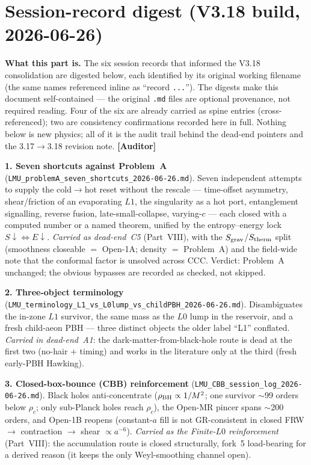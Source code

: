 \documentclass[11pt]{article}
\newcommand{\Auditor}{\textbf{\textcolor{teal!55!black}{[Auditor]}}}
\begin{document}
{}

\part{Session-record digest (V3.18 build, 2026-06-26)}
\noindent\textbf{What this part is.} The six session records that informed the V3.18 consolidation are digested below, each identified by its original working filename (the same names referenced inline as ``record \texttt{...}''). The digests make this document self-contained --- the original \texttt{.md} files are optional provenance, not required reading. Four of the six are already carried as spine entries (cross-referenced); two are consistency confirmations recorded here in full. Nothing below is new physics; all of it is the audit trail behind the dead-end pointers and the 3.17$\to$3.18 revision note. \Auditor

\smallskip\noindent\textbf{1. Seven shortcuts against Problem~A} (\texttt{LMU\_problemA\_seven\_shortcuts\_2026-06-26.md}). Seven independent attempts to supply the cold$\to$hot reset without the rescale --- time-offset asymmetry, shear/friction of an evaporating $L1$, the singularity as a hot port, entanglement signalling, reverse fusion, late-small-collapse, varying-$c$ --- each closed with a computed number or a named theorem, unified by the entropy--energy lock $S\!\downarrow\Leftrightarrow E\!\downarrow$. \emph{Carried as dead-end~C5} (Part~VIII), with the $S_{\rm grav}$/$S_{\rm therm}$ split (smoothness closeable $=$ Open-1A; density $=$ Problem~A) and the field-wide note that the conformal factor is unsolved across CCC. Verdict: Problem~A unchanged; the obvious bypasses are recorded as checked, not skipped.

\smallskip\noindent\textbf{2. Three-object terminology} (\texttt{LMU\_terminology\_L1\_vs\_L0lump\_vs\_childPBH\_2026-06-26.md}). Disambiguates the in-zone $L1$ survivor, the same mass as the $L0$ lump in the reservoir, and a fresh child-aeon PBH --- three distinct objects the older label ``L1'' conflated. \emph{Carried in dead-end~A1}: the dark-matter-from-black-hole route is dead at the first two (no-hair $+$ timing) and works in the literature only at the third (fresh early-PBH Hawking).

\smallskip\noindent\textbf{3. Closed-box-bounce (CBB) reinforcement} (\texttt{LMU\_CBB\_session\_log\_2026-06-26.md}). Black holes anti-concentrate ($\rho_{\rm BH}\propto1/M^2$; one survivor $\sim$99 orders below $\rho_c$; only sub-Planck holes reach $\rho_c$), the Open-MR pincer spans $\sim$200 orders, and Open-1B reopens (constant-$a$ fill is not GR-consistent in closed FRW $\to$ contraction $\to$ shear $\propto a^{-6}$). \emph{Carried as the Finite-$L0$ reinforcement} (Part~VIII): the accumulation route is closed structurally, fork~5 load-bearing for a derived reason (it keeps the only Weyl-smoothing channel open).
\end{document}
